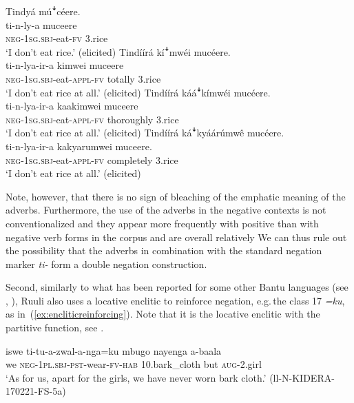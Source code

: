 \documentclass[output=paper,colorlinks,citecolor=brown,draftmode]{langscibook}
\begin{document}
\ea \label{ex:reinforcing}
\begin{xlist}

\ex \label{ex:noinf}
	\glll   Tindyá múꜜcéere.\\
	        ti-n-ly-a muceere\\
		    \textsc{neg}-1\textsc{sg.sbj}-eat-\textsc{fv} 3.rice\\
	\glt ‘I don't eat rice.’  (elicited)
\ex \label{ex:inflittle}
	\glll   Tindíírá kíꜜmwéi mucéere.\\
	        ti-n-lya-ir-a kimwei muceere\\
	    	\textsc{neg}-1\textsc{sg.sbj}-eat-\textsc{appl}-\textsc{fv} totally 3.rice\\
	\glt ‘I don't eat rice at all.’  (elicited)
\ex \label{ex:infmore}
	\glll    Tindíírá kááꜜkímwéi mucéere.\\
	        ti-n-lya-ir-a kaakimwei muceere\\
	    	\textsc{neg}-1\textsc{sg.sbj}-eat-\textsc{appl}-\textsc{fv} thoroughly 3.rice\\
	\glt ‘I don't eat rice at all.’  (elicited)
\ex \label{ex:infstrongest}
	\glll   Tindíírá káꜜkyáárúmwê mucéere.\\
	        ti-n-lya-ir-a kakyarumwei muceere.\\
		    \textsc{neg}-1\textsc{sg.sbj}-eat-\textsc{appl}-\textsc{fv} completely 3.rice\\
	\glt ‘I don't eat rice at all.’   (elicited)
\end{xlist}
\z

Note, however, that there is no sign of bleaching of the emphatic meaning of the adverbs. 
Furthermore, the use of the adverbs in the negative contexts is not conventionalized and they appear more frequently with positive than with negative verb forms in the corpus and are overall relatively 
We can thus rule out the possibility that the adverbs in combination with the standard negation marker \textit{ti-} form a double negation construction. 

Second, similarly to what has been reported for some other Bantu languages (see \citealt{DevosAuwera2013}, \citealt{ PersohnDevos2017}), 
Ruuli also uses a locative enclitic to reinforce negation, e.g.\,the class 17 \textit{=ku}, as in~(\ref{ex:encliticreinforcing}). 
Note that it is the locative enclitic with the partitive function, see .

\ea \label{ex:encliticreinforcing}
    \ea \label{ex:enclitic1.a}
    	\gll    iswe ti-tu-a-zwal-a-nga=ku mbugo nayenga a-baala\\ %
    	we \textsc{neg}-1\textsc{pl.sbj}-\textsc{pst}-wear-\textsc{fv}-\textsc{hab} 10.bark\_cloth but \textsc{aug}-2.girl\\
    	\glt ‘As for us, apart for the girls, we have never worn bark cloth.’ (ll-N-KIDERA-170221-FS-5a)
    	
\end{document}
